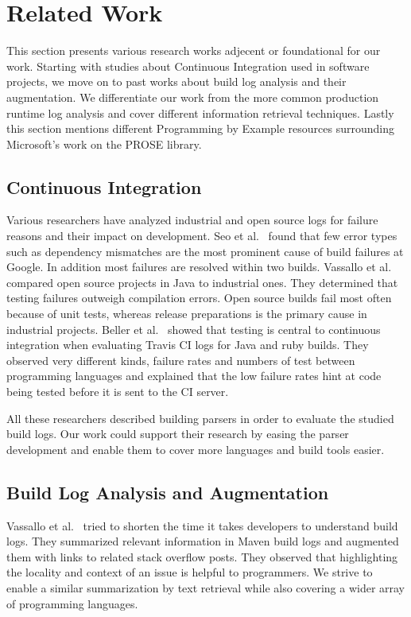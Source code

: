 \documentclass[\myrootdir/main.tex]{subfiles}
\begin{document}
\chapter{Related Work}
\label{sec:rw}
This section presents various research works adjecent or foundational for our work. Starting with studies about Continuous Integration used in software projects, we move on to past works about build log analysis and their augmentation. We differentiate our work from the more common production runtime log analysis and cover different information retrieval techniques. Lastly this section mentions different Programming by Example resources surrounding Microsoft's work on the PROSE library.

\section{Continuous Integration}
Various researchers have analyzed industrial and open source logs for failure reasons and their impact on development. Seo et al.~\cite{seo2014programmers} found that few error types such as dependency mismatches are the most prominent cause of build failures at Google. In addition most failures are resolved within two builds. Vassallo et al.~\cite{vassallo2017a-tale} compared open source projects in Java to industrial ones. They determined that testing failures outweigh compilation errors. Open source builds fail most often because of unit tests, whereas release preparations is the primary cause in industrial projects. Beller et al.~\cite{beller2017oops} showed that testing is central to continuous integration when evaluating Travis CI logs for Java and ruby builds. They observed very different kinds, failure rates and numbers of test between programming languages and explained that the low failure rates hint at code being tested before it is sent to the CI server.

All these researchers described building parsers in order to evaluate the studied build logs. Our work could support their research by easing the parser development and enable them to cover more languages and build tools easier.

\section{Build Log Analysis and Augmentation}
Vassallo et al.~\cite{vassallo2018un-break} tried to shorten the time it takes developers to understand build logs. They summarized relevant information in Maven build logs and augmented them with links to related stack overflow posts. They observed that highlighting the locality and context of an issue is helpful to programmers. We strive to enable a similar summarization by text retrieval while also covering a wider array of programming languages.
\end{document}
